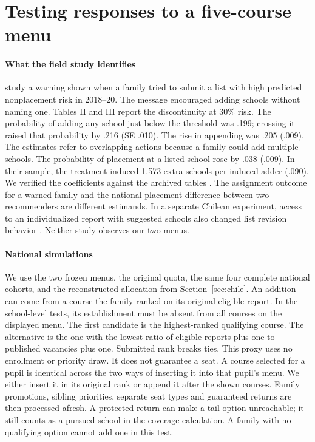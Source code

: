 \section{Testing responses to a five-course menu}\label{sec:behavior-tests}
\paragraph{What the field study identifies}
\citet{smartplatforms} study a warning shown when a family tried to submit a list with high predicted nonplacement risk in 2018--20. The message encouraged adding schools without naming one. Tables II and III report the discontinuity at 30\% risk. The probability of adding any school just below the threshold was .199; crossing it raised that probability by .216 (SE .010). The rise in appending was .205 (.009). The estimates refer to overlapping actions because a family could add multiple schools. The probability of placement at a listed school rose by .038 (.009). In their sample, the treatment induced 1.573 extra schools per induced adder (.090). We verified the coefficients against the archived tables \citep{warningdata}. The assignment outcome for a warned family and the national placement difference between two recommenders are different estimands. In a separate Chilean experiment, access to an individualized report with suggested schools also changed list revision behavior \citep{schoolSearch}. Neither study observes our two menus.

\paragraph{National simulations}
We use the two frozen menus, the original quota, the same four complete national cohorts, and the reconstructed allocation from Section~\ref{sec:chile}. An addition can come from a course the family ranked on its original eligible report. In the school-level tests, its establishment must be absent from all courses on the displayed menu. The first candidate is the highest-ranked qualifying course. The alternative is the one with the lowest ratio of eligible reports plus one to published vacancies plus one. Submitted rank breaks ties. This proxy uses no enrollment or priority draw. It does not guarantee a seat. A course selected for a pupil is identical across the two ways of inserting it into that pupil's menu. We either insert it in its original rank or append it after the shown courses. Family promotions, sibling priorities, separate seat types and guaranteed returns are then processed afresh. A protected return can make a tail option unreachable; it still counts as a pursued school in the coverage calculation. A family with no qualifying option cannot add one in this test.

